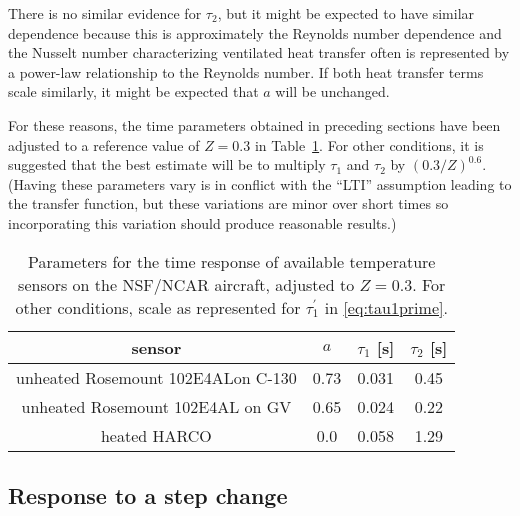 \documentclass[11pt,twoside,american,12pt,twoside,american]{article}\usepackage[]{graphicx}\usepackage[]{color}
\providecommand{\tabularnewline}{\\}
\begin{document}
 There is no similar evidence for $\tau_{2}$, but it might be expected
to have similar dependence because this is approximately the Reynolds
number dependence and the Nusselt number characterizing ventilated
heat transfer often is represented by a power-law relationship to
the Reynolds number. If both heat transfer terms scale similarly,
it might be expected that $a$ will be unchanged.

For these reasons, the time parameters obtained in preceding sections
have been adjusted to a reference value of $Z=0.3$ in Table~\ref{tab:Parameters}.
For other conditions, it is suggested that the best estimate will
be to multiply $\tau_{1}$ and $\tau_{2}$ by $(0.3/Z)^{0.6}$. (Having
these parameters vary is in conflict with the ``LTI'' assumption
leading to the transfer function, but these variations are minor over
short times so incorporating this variation should produce reasonable
results.)


\begin{center}
\begin{table}[h]
\begin{centering}
\begin{tabular}{|c|c|c|c|}
\hline 
\textbf{sensor} &
\textbf{$a$} &
\textbf{$\tau_{1}$} {[}s{]} &
\textbf{$\tau_{2}$} {[}s{]}\tabularnewline
\hline 
\hline 
unheated Rosemount 102E4ALon C-130 &
0.73 &
0.031 &
0.45\tabularnewline
\hline 
unheated Rosemount 102E4AL on GV &
0.65 &
0.024 &
0.22\tabularnewline
\hline 
heated HARCO &
0.0 &
0.058 &
1.29\tabularnewline
\hline 
\end{tabular}
\par\end{centering}
\centering{}\caption{Parameters for the time response of available temperature sensors
on the NSF/NCAR aircraft, adjusted to $Z=0.3$. For other conditions,
scale as represented for $\tau_{1}^{\prime}$ in \eqref{eq:tau1prime}.\label{tab:Parameters}}
\end{table}
\par\end{center}


\subsection{Response to a step change}
\end{document}
